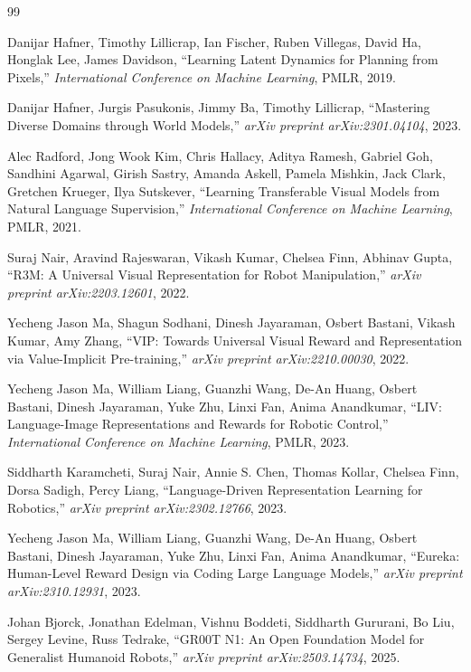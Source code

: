 \documentclass[11pt]{article}
\begin{document}
\clearpage
\clearpage
\begin{thebibliography}{99}

Danijar Hafner, Timothy Lillicrap, Ian Fischer, Ruben Villegas, David Ha, Honglak Lee, James Davidson,
``Learning Latent Dynamics for Planning from Pixels,''
\textit{International Conference on Machine Learning}, PMLR, 2019.

Danijar Hafner, Jurgis Pasukonis, Jimmy Ba, Timothy Lillicrap,
``Mastering Diverse Domains through World Models,''
\textit{arXiv preprint arXiv:2301.04104}, 2023.

Alec Radford, Jong Wook Kim, Chris Hallacy, Aditya Ramesh, Gabriel Goh, Sandhini Agarwal, Girish Sastry, Amanda Askell, Pamela Mishkin, Jack Clark, Gretchen Krueger, Ilya Sutskever,
``Learning Transferable Visual Models from Natural Language Supervision,''
\textit{International Conference on Machine Learning}, PMLR, 2021.

Suraj Nair, Aravind Rajeswaran, Vikash Kumar, Chelsea Finn, Abhinav Gupta,
``R3M: A Universal Visual Representation for Robot Manipulation,''
\textit{arXiv preprint arXiv:2203.12601}, 2022.

Yecheng Jason Ma, Shagun Sodhani, Dinesh Jayaraman, Osbert Bastani, Vikash Kumar, Amy Zhang,
``VIP: Towards Universal Visual Reward and Representation via Value-Implicit Pre-training,''
\textit{arXiv preprint arXiv:2210.00030}, 2022.

Yecheng Jason Ma, William Liang, Guanzhi Wang, De-An Huang, Osbert Bastani, Dinesh Jayaraman, Yuke Zhu, Linxi Fan, Anima Anandkumar,
``LIV: Language-Image Representations and Rewards for Robotic Control,''
\textit{International Conference on Machine Learning}, PMLR, 2023.

Siddharth Karamcheti, Suraj Nair, Annie S. Chen, Thomas Kollar, Chelsea Finn, Dorsa Sadigh, Percy Liang,
``Language-Driven Representation Learning for Robotics,''
\textit{arXiv preprint arXiv:2302.12766}, 2023.

Yecheng Jason Ma, William Liang, Guanzhi Wang, De-An Huang, Osbert Bastani, Dinesh Jayaraman, Yuke Zhu, Linxi Fan, Anima Anandkumar,
``Eureka: Human-Level Reward Design via Coding Large Language Models,''
\textit{arXiv preprint arXiv:2310.12931}, 2023.

Johan Bjorck, Jonathan Edelman, Vishnu Boddeti, Siddharth Gururani, Bo Liu, Sergey Levine, Russ Tedrake,
``GR00T N1: An Open Foundation Model for Generalist Humanoid Robots,''
\textit{arXiv preprint arXiv:2503.14734}, 2025.


\end{thebibliography}
\end{document}
